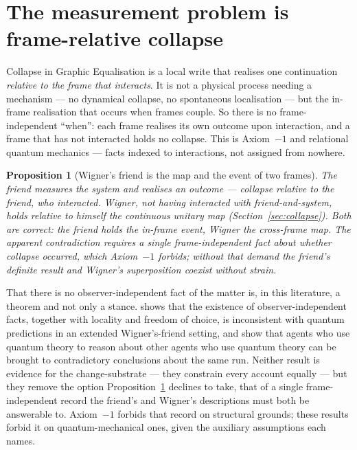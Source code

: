 \documentclass[11pt,a4paper]{article}
\newtheorem{proposition}[definition]{Proposition}
\theoremstyle{remark}\newtheorem{remark}[definition]{Remark}
\begin{document}
\section{The measurement problem is frame-relative collapse}\label{sec:measurement}
Collapse in Graphic Equalisation is a local write that realises one continuation
\emph{relative to the frame that interacts}. It is not a physical process needing
a mechanism --- no dynamical collapse, no spontaneous localisation --- but the
in-frame realisation that occurs when frames couple. So there is no
frame-independent ``when'': each frame realises its own outcome upon interaction,
and a frame that has not interacted holds no collapse. This is Axiom~$-1$ and
relational quantum mechanics \citep{rovelli1996} --- facts indexed to
interactions, not assigned from nowhere.

\begin{proposition}[Wigner's friend is the map and the event of two frames]\label{prop:wigner}
The friend measures the system and realises an outcome --- collapse relative to
the friend, who interacted. Wigner, not having interacted with friend-and-system,
holds relative to himself the continuous unitary \emph{map} (Section~\ref{sec:collapse}).
Both are correct: the friend holds the in-frame \emph{event}, Wigner the
cross-frame \emph{map}. The apparent contradiction requires
a single frame-independent fact about whether collapse occurred, which
Axiom~$-1$ forbids; without that demand the friend's definite result and Wigner's
superposition coexist without strain.
\end{proposition}

That there is no observer-independent fact of the matter is, in this literature, a
theorem and not only a stance. \citet{brukner2018} shows that the existence of
observer-independent facts, together with locality and freedom of choice, is
inconsistent with quantum predictions in an extended Wigner's-friend setting, and
\citet{frauchiger2018} show that agents who use quantum theory to reason about other
agents who use quantum theory can be brought to contradictory conclusions about the
same run. Neither result is evidence for the change-substrate --- they constrain
every account equally --- but they remove the option Proposition~\ref{prop:wigner}
declines to take, that of a single frame-independent record the friend's and Wigner's
descriptions must both be answerable to. Axiom~$-1$ forbids that record on structural
grounds; these results forbid it on quantum-mechanical ones, given the auxiliary assumptions each names.
\end{document}

